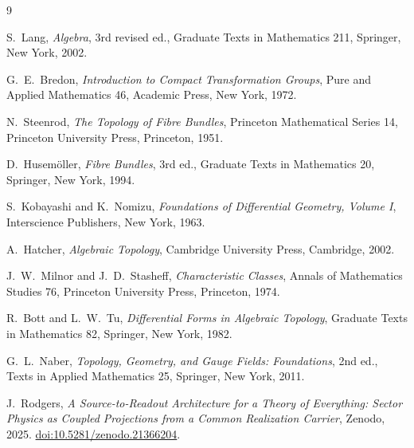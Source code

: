\documentclass[11pt,reqno]{amsart}
\theoremstyle{plain}
\theoremstyle{definition}
\theoremstyle{remark}
\begin{document}
\begin{thebibliography}{9}

S.~Lang,
\emph{Algebra},
3rd revised ed.,
Graduate Texts in Mathematics 211,
Springer, New York, 2002.

G.~E.~Bredon,
\emph{Introduction to Compact Transformation Groups},
Pure and Applied Mathematics 46,
Academic Press, New York, 1972.

N.~Steenrod,
\emph{The Topology of Fibre Bundles},
Princeton Mathematical Series 14,
Princeton University Press, Princeton, 1951.

D.~Husem\"oller,
\emph{Fibre Bundles},
3rd ed.,
Graduate Texts in Mathematics 20,
Springer, New York, 1994.

S.~Kobayashi and K.~Nomizu,
\emph{Foundations of Differential Geometry, Volume I},
Interscience Publishers, New York, 1963.

A.~Hatcher,
\emph{Algebraic Topology},
Cambridge University Press, Cambridge, 2002.

J.~W.~Milnor and J.~D.~Stasheff,
\emph{Characteristic Classes},
Annals of Mathematics Studies 76,
Princeton University Press, Princeton, 1974.

R.~Bott and L.~W.~Tu,
\emph{Differential Forms in Algebraic Topology},
Graduate Texts in Mathematics 82,
Springer, New York, 1982.

G.~L.~Naber,
\emph{Topology, Geometry, and Gauge Fields: Foundations},
2nd ed.,
Texts in Applied Mathematics 25,
Springer, New York, 2011.

J.~Rodgers,
\emph{A Source-to-Readout Architecture for a Theory of Everything: Sector Physics as Coupled Projections from a Common Realization Carrier},
Zenodo, 2025.
\href{https://doi.org/10.5281/zenodo.21366204}{doi:10.5281/zenodo.21366204}.

\end{thebibliography}
\end{document}
